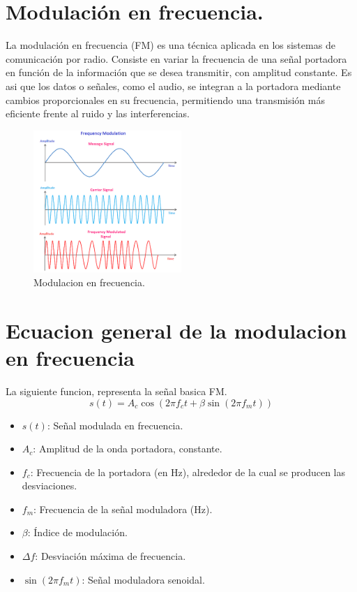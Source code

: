 \documentclass[conference]{IEEEtran}
\begin{document}
	\section{Modulación en frecuencia.}
	La modulación en frecuencia (FM) es una técnica aplicada en los sistemas de comunicación por radio. Consiste en variar la frecuencia de una señal portadora en función de la información que se desea transmitir, con amplitud constante. Es asi que  los datos o señales, como el audio, se integran a la portadora mediante cambios proporcionales en su frecuencia, permitiendo una transmisión más eficiente frente al ruido y las interferencias.
	\begin{figure}[h]
		\centering
		\includegraphics[width=0.5\textwidth]{media/modulacion-fm}
		\caption{Modulacion en frecuencia.}
		\label{fig:enter-label}
	\end{figure}
	\section{Ecuacion general de la modulacion en frecuencia}
	La siguiente funcion, representa la señal basica FM.
	\[
	s(t) = A_c \cos\left(2\pi f_c t + \beta \sin(2\pi f_m t)\right)
	\]
	\begin{itemize}
		\item $s(t)$: Señal modulada en frecuencia.
		\item $A_c$: Amplitud de la onda portadora, constante.
		\item $f_c$: Frecuencia de la portadora (en Hz), alrededor de la cual se producen las desviaciones.
		\item $f_m$: Frecuencia de la señal moduladora (Hz).
		\item $\beta$: Índice de modulación.
		\item $\Delta f$: Desviación máxima de frecuencia.
		\item $\sin(2\pi f_m t)$: Señal moduladora senoidal.
	\end{itemize}
\end{document}
